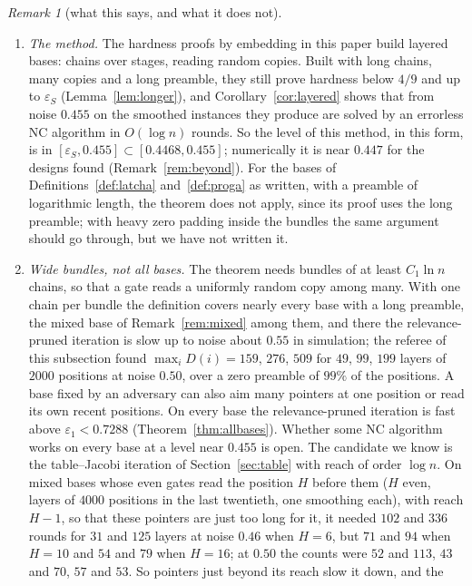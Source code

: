 \documentclass[11pt]{amsart}
\theoremstyle{definition}
\theoremstyle{remark}
\newtheorem{remark}[theorem]{Remark}
\newcommand{\eps}{\varepsilon}
\begin{document}
\begin{remark}[what this says, and what it does not]\label{rem:layered}
\begin{enumerate}[label=(\roman*),leftmargin=2.4em]
\item \emph{The method.} The hardness proofs by embedding in this paper build layered bases:
chains over stages, reading random copies. Built with long chains, many copies and a long
preamble, they still prove hardness below $4/9$ and up to $\eps_S$ (Lemma~\ref{lem:longer}), and
Corollary~\ref{cor:layered} shows that from noise $0.455$ on the smoothed instances they produce
are solved by an errorless NC algorithm in $O(\log n)$ rounds. So the level of this method, in this
form, is in $[\eps_S,0.455]\subset[0.4468,0.455]$; numerically it is near $0.447$ for the designs
found (Remark~\ref{rem:beyond}). For the bases of Definitions~\ref{def:latcha}
and~\ref{def:proga} as written, with a preamble of logarithmic length, the theorem does not apply,
since its proof uses the long preamble; with heavy zero padding inside the bundles the same
argument should go through, but we have not written it.
\item \emph{Wide bundles, not all bases.} The theorem needs bundles of at least $C_1\ln n$ chains,
so that a gate reads a uniformly random copy among many. With one chain per bundle the definition
covers nearly every base with a long preamble, the mixed base of Remark~\ref{rem:mixed} among
them, and there the relevance-pruned iteration is slow up to noise about $0.55$ in simulation; the
referee of this subsection found $\max_iD(i)=159$, $276$, $509$ for $49$, $99$, $199$ layers of
$2000$ positions at noise $0.50$, over a zero preamble of $99\%$ of the positions. A base fixed by
an adversary can also aim many pointers at one position or read its own recent positions.
On every base the relevance-pruned iteration is fast above $\eps_1<0.7288$
(Theorem~\ref{thm:allbases}). Whether some NC algorithm works on every base at a level near
$0.455$ is open. The candidate we know is the table--Jacobi iteration of Section~\ref{sec:table} with reach of order $\log n$. On
mixed bases whose even gates read the position $H$ before them ($H$ even, layers of $4000$
positions in the last twentieth, one smoothing each), with reach $H-1$, so that these pointers are
just too long for it, it needed $102$ and $336$ rounds for $31$ and $125$ layers at noise $0.46$
when $H=6$, but $71$ and $94$ when $H=10$ and $54$ and $79$ when $H=16$; at $0.50$ the counts were
$52$ and $113$, $43$ and $70$, $57$ and $53$. So pointers just beyond its reach slow it down, and the

\end{enumerate}
\end{remark}
\end{document}
